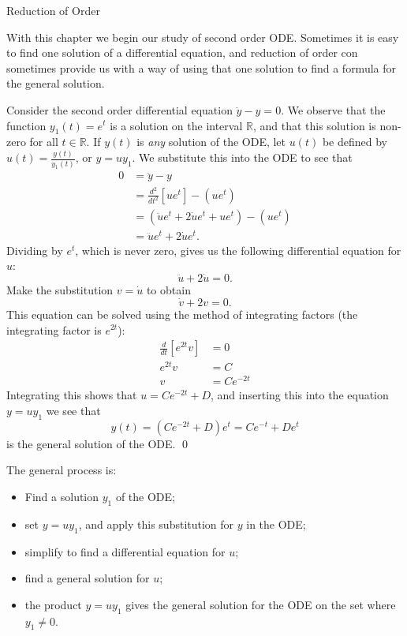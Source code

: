 \documentclass[12pt,letterpaper,twoside]{amsart}
\newcounter{example}
\newcounter{exercise}
\newcommand{\example}{\bigskip \noindent {\large {\sc Example \arabic{example}:}} \addtocounter{example}{1}}
\begin{document}
\sffamily

\begin{center} {\LARGE Reduction of Order} \end{center}

\setcounter{example}{1}
\setcounter{exercise}{1}

With this chapter we begin our study of second order ODE.  Sometimes it is easy to find one solution of a differential equation, and reduction of order con sometimes provide us with a way of using that one solution to find a formula for the general solution.

\example Consider the second order differential equation $\ddot{y}-y=0$.  We observe that the function $y_1(t)=e^t$ is a solution on the interval $\mathbb{R}$, and that this solution is non-zero for all $t \in \mathbb{R}$.  If $y(t)$ is {\it any} solution of the ODE, let $u(t)$ be defined by $u(t)=\frac{y(t)}{y_1(t)}$, or $y=uy_1$.  We substitute this into the ODE to see that
\begin{align*}
0 & = \ddot{y}-y \\
& = \frac{d^2}{dt^2}\left[ ue^t \right] - (ue^t)\\
& = (\ddot{u}e^t + 2\dot{u}e^t + ue^t)-(ue^t) \\
& = \ddot{u}e^t+2\dot{u}e^t.
\end{align*}
Dividing by $e^t$, which is never zero, gives us the following differential equation for $u$:
\[ \ddot{u}+2\dot{u}=0.\]
Make the substitution $v=\dot{u}$ to obtain
\[ \dot{v}+2v=0.\]
This equation can be solved using the method of integrating factors (the integrating factor is $e^{2t}$):
\begin{align*}
\frac{d}{dt} \left[ e^{2t} v \right] & = 0 \\
e^{2t} v & = C \\
v & = Ce^{-2t}
\end{align*}
Integrating this shows that $u=Ce^{-2t}+D$, and inserting this into the equation $y=uy_1$ we see that
\[ y(t)=(Ce^{-2t}+D)e^t = Ce^{-t}+De^{t}\]
is the general solution of the ODE.
\qed

The general process is:
\begin{itemize}
\item Find a solution $y_1$ of the ODE;
\item set $y=uy_1$, and apply this substitution for $y$ in the ODE;
\item simplify to find a differential equation for $u$;
\item find a general solution for $u$;
\item the product $y=uy_1$ gives the general solution for the ODE on the set where $y_1 \neq 0$.
\end{itemize}
\end{document}
